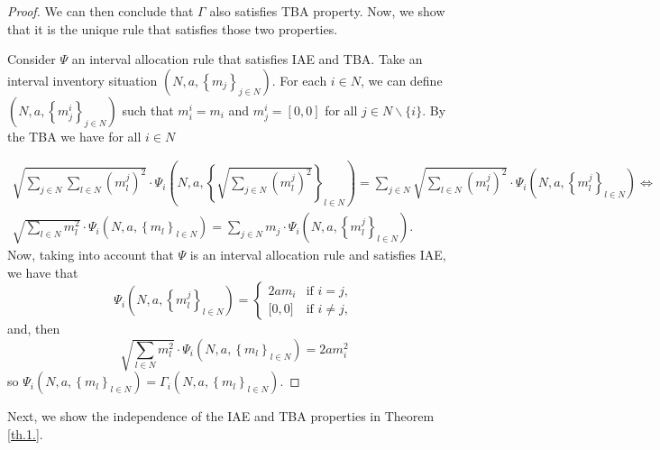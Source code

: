 \documentclass[12pt]{article}
\begin{document}
\begin{proof}
We can then conclude that $\Gamma$ also satisfies TBA property. Now, we show that it is the unique rule that satisfies those two properties. 

Consider $\Psi $ an interval allocation rule that satisfies IAE and TBA. Take an interval inventory situation $(N,a,\left\{ m_{j}\right\} _{j\in
N})$. For each $i\in N$, we can define $(N,a,\left\{ m^i_j\right\} _{j\in
N})$ such that $m^i_i=m_i$ and $m^i_j=\left[0,0\right]$ for all $j\in N\backslash\{i\}$. By the TBA we have for all $i\in N$ 

\begin{equation*}
\begin{split}
    \sqrt{\sum_{j\in N}\sum_{l\in N}(m^j_l)^2}\cdot \Psi_i \left(N,a,\left\{ \sqrt{\sum_{j\in N}(m^j_l)^2}\right\} _{l\in
N}\right)=
\sum_{j\in N}\sqrt{\sum_{l\in N}(m^j_l)^2}\cdot\Psi_i \left(N,a,\left\{ m^j_l\right\} _{l\in
N}\right)\Leftrightarrow\\
\sqrt{\sum_{l\in N}m_l^2}\cdot \Psi_i \left(N,a,\left\{ m_l\right\} _{l\in
N}\right)=\sum_{j\in N}m_j\cdot\Psi_i \left(N,a,\left\{ m^j_l\right\} _{l\in
N}\right).
\end{split}
\end{equation*}
\noindent Now, taking into account that $\Psi $ is  an interval allocation rule and satisfies IAE, we have that 
\begin{equation*}
\Psi_i \left(N,a,\left\{ m^j_l\right\} _{l\in
N}\right)=%
\begin{cases}
2am_i & \text{if }i=j, \\ 
\lbrack 0,0] & \text{if }i\neq j,%
\end{cases}%
\end{equation*}%
and, then 
\begin{equation*}
\sqrt{\sum_{l\in N}m_l^2}\cdot \Psi_i \left(N,a,\left\{ m_l\right\} _{l\in
N}\right)=2am_i^2
\end{equation*}%
so $\Psi _{i}\left(N,a,\left\{ m_l\right\} _{l\in
N}\right)=\Gamma _{i}\left(N,a,\left\{ m_l\right\} _{l\in
N}\right)$. 
\end{proof}
\medskip


Next, we show the independence of the IAE and TBA properties in Theorem \ref{th.1.}.
\end{document}
